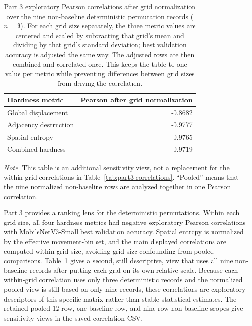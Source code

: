 \documentclass[12pt]{article}
\newcommand{\reporttablesize}{\small}
\newcommand{\reporttablenotesize}{\small}
\begin{document}
\begin{table}[t]
  \centering
  \reporttablesize
  \begin{tabular}{lr}
    \toprule
    \textbf{Hardness metric} & \textbf{Pearson after grid normalization} \\
    \midrule
    Global displacement & -0.8682 \\
    Adjacency destruction & -0.9777 \\
    Spatial entropy & -0.9765 \\
    Combined hardness & -0.9719 \\
    \bottomrule
  \end{tabular}
  \caption{Part 3 exploratory Pearson correlations after grid normalization over the nine non-baseline deterministic permutation records ($n=9$). For each grid size separately, the three metric values are centered and scaled by subtracting that grid's mean and dividing by that grid's standard deviation; best validation accuracy is adjusted the same way. The adjusted rows are then combined and correlated once. This keeps the table to one value per metric while preventing differences between grid sizes from driving the correlation.}
  \label{tab:part3-grid-standardized-correlations}
  \begin{flushleft}
  \reporttablenotesize\emph{Note.} This table is an additional sensitivity view, not a replacement for the within-grid correlations in Table~\ref{tab:part3-correlations}. ``Pooled'' means that the nine normalized non-baseline rows are analyzed together in one Pearson correlation.
  \end{flushleft}
\end{table}

Part 3 provides a ranking lens for the deterministic permutations. Within each grid size, all four hardness metrics had negative exploratory Pearson correlations with MobileNetV3-Small best validation accuracy. Spatial entropy is normalized by the effective movement-bin set, and the main displayed correlations are computed within grid size, avoiding grid-size confounding from pooled comparisons. Table~\ref{tab:part3-grid-standardized-correlations} gives a second, still descriptive, view that uses all nine non-baseline records after putting each grid on its own relative scale. Because each within-grid correlation uses only three deterministic records and the normalized pooled view is still based on only nine records, these correlations are exploratory descriptors of this specific matrix rather than stable statistical estimates. The retained pooled 12-row, one-baseline-row, and nine-row non-baseline scopes give sensitivity views in the saved correlation CSV.
\end{document}
